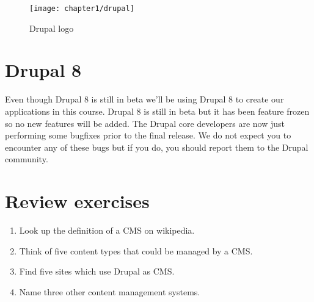  \begin{figure}[H]
 	\centering
 	\texttt{[image: chapter1/drupal]}
 	\caption{Drupal logo}
 	\label{fig:drupal-logo}
 \end{figure}
 
 \section{Drupal 8}
 
Even though Drupal 8 is still in beta we'll be using Drupal 8 to create our applications in this course. Drupal 8 is still in beta but it has been feature frozen so no new features will be added. The Drupal core developers are now just performing some bugfixes prior to the final release. We do not expect you to encounter any of these bugs but if you do, you should report them to the Drupal community.
 
 \section{Review exercises}
 
 \begin{enumerate}
 	\item Look up the definition of a CMS on wikipedia.
 	\item Think of five content types that could be managed by a CMS.
 	\item Find five sites which use Drupal as CMS.
 	\item Name three other content management systems.
 \end{enumerate}